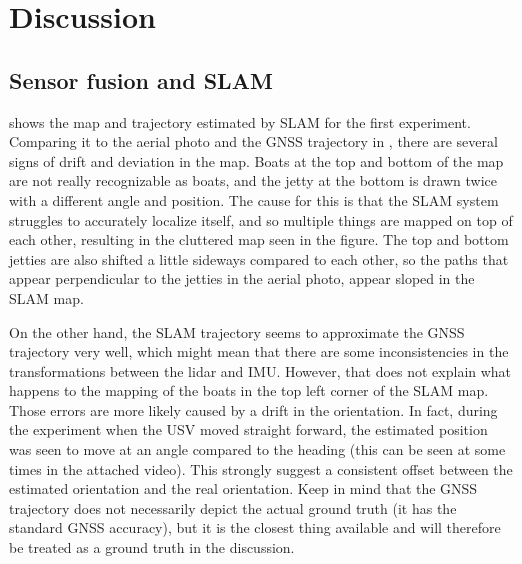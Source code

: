 \restoregeometry

\FloatBarrier

\section{Discussion}

\subsection{Sensor fusion and SLAM}

 shows the map and trajectory estimated by SLAM for the first experiment. Comparing it to the aerial photo and the GNSS trajectory in , there are several signs of drift and deviation in the map. Boats at the top and bottom of the map are not really recognizable as boats, and the jetty at the bottom is drawn twice with a different angle and position. The cause for this is that the SLAM system struggles to accurately localize itself, and so multiple things are mapped on top of each other, resulting in the cluttered map seen in the figure. The top and bottom jetties are also shifted a little sideways compared to each other, so the paths that appear perpendicular to the jetties in the aerial photo, appear sloped in the SLAM map.

 On the other hand, the SLAM trajectory seems to approximate the GNSS trajectory very well, which might mean that there are some inconsistencies in the transformations between the lidar and IMU. However, that does not explain what happens to the mapping of the boats in the top left corner of the SLAM map. Those errors are more likely caused by a drift in the orientation. In fact, during the experiment when the USV moved straight forward, the estimated position was seen to move at an angle compared to the heading (this can be seen at some times in the attached video). This strongly suggest a consistent offset between the estimated orientation and the real orientation. Keep in mind that the GNSS trajectory does not necessarily depict the actual ground truth (it has the standard GNSS accuracy), but it is the closest thing available and will therefore be treated as a ground truth in the discussion.

